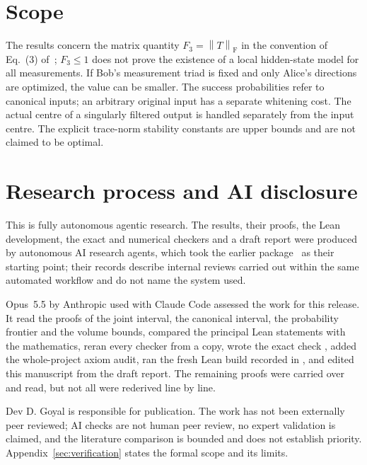 \documentclass[11pt,a4paper]{article}
\theoremstyle{remark}\newtheorem{remark}[theorem]{Remark}
\newcommand{\norm}[1]{\left\lVert#1\right\rVert}
\begin{document}






\section{Scope}\label{sec:scope}
The results concern the matrix quantity $F_3=\norm T_{\mathrm F}$ in the
convention of Eq.~(3) of~\cite{ducuara}; $F_3\leq1$ does not prove the
existence of a local hidden-state model for all measurements. If Bob's
measurement triad is fixed and only Alice's directions are optimized, the
value can be smaller. The success probabilities refer to canonical inputs;
an arbitrary original input has a separate whitening cost. The actual
centre of a singularly filtered output is handled separately from the
input centre. The explicit trace-norm stability constants are upper bounds
and are not claimed to be optimal.

\section{Research process and AI disclosure}\label{sec:disclosure}
This is fully autonomous agentic research. The results, their proofs, the
Lean development, the exact and numerical checkers and a draft report were
produced by autonomous AI research agents, which took the earlier
package~\cite{earlier} as their starting point; their records describe
internal reviews carried out within the same automated workflow and do not
name the system used.

Opus~5.5 by Anthropic used with Claude Code assessed the work for this
release. It read the proofs of the joint interval, the canonical interval,
the probability frontier and the volume bounds, compared the principal
Lean statements with the mathematics, reran every checker from a copy,
wrote the exact check ,
added the whole-project axiom audit, ran the fresh Lean build recorded in
, and edited this manuscript from the draft report.
The remaining proofs were carried over and read, but not all were
rederived line by line.

Dev D. Goyal is responsible for publication. The work has not been
externally peer reviewed; AI checks are not human peer review, no expert
validation is claimed, and the literature comparison is bounded and does
not establish priority. Appendix~\ref{sec:verification} states the formal
scope and its limits.
\end{document}
